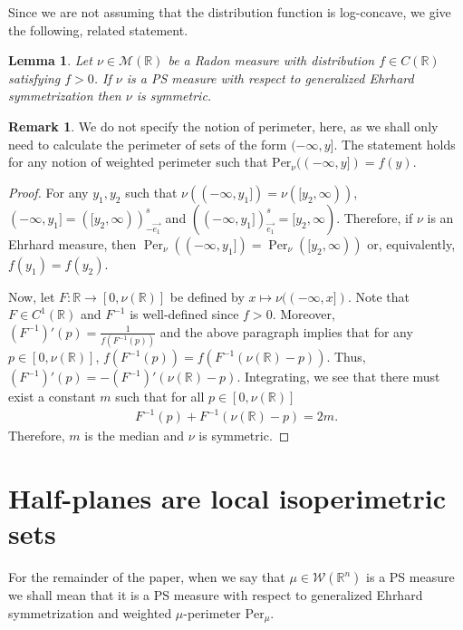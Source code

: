 \documentclass[12pt]{amsart}
\numberwithin{equation}{section}
\theoremstyle{plain}
\newtheorem{lemma}[theorem]{Lemma}
\theoremstyle{definition}
\newtheorem{remark}[theorem]{Remark}
\begin{document}
Since we are not assuming that the distribution function is log-concave, we give the following, related statement.


\begin{lemma}\label{l:Ehrhard implies symmetric}
    Let $\nu \in \mathcal{M}(\mathbb{R})$ be a Radon measure with distribution $f \in C(\mathbb{R})$ satisfying $f>0$.  If $\nu$ is a PS measure with respect to generalized Ehrhard symmetrization then $\nu$ is symmetric. 
\end{lemma}

\begin{remark}
    We do not specify the notion of perimeter, here, as we shall only need to calculate the perimeter of sets of the form $(-\infty, y]$. The statement holds for any notion of weighted perimeter such that $\text{Per}_{\nu}((-\infty, y]) = f(y)$. 
    \end{remark}

\begin{proof}
    For any $y_1,y_2$ such that $\nu((-\infty, y_1]) = \nu([y_2, \infty))$, $(-\infty, y_1] = ([y_2, \infty))^s_{-\vec{e_1}}$ and $((-\infty, y_1])^s_{\vec{e_1}} = [y_2, \infty)$.  Therefore, if $\nu$ is an Ehrhard measure, then $\operatorname{Per}_{\nu}((-\infty, y_1]) = \operatorname{Per}_{\nu}([y_2,\infty))$ or, equivalently, $f(y_1)=f(y_2)$.

    Now, let $F: \mathbb{R} \rightarrow [0, \nu(\mathbb{R})]$ be defined by $x \mapsto \nu((-\infty, x])$.  Note that $F \in C^1(\mathbb{R})$ and $F^{-1}$ is well-defined since $f>0$.  Moreover, $(F^{-1})'(p) = \frac{1}{f(F^{-1}(p))}$ and the above paragraph implies that for any $p \in [0, \nu(\mathbb{R})]$, $f(F^{-1}(p)) = f(F^{-1}(\nu(\mathbb{R}) -p))$. Thus, $(F^{-1})'(p) = -(F^{-1})'(\nu(\mathbb{R})-p)$.  Integrating, we see that there must exist a constant $m$ such that for all $p \in [0, \nu(\mathbb{R})]$ 
    \begin{align*}
        F^{-1}(p) + F^{-1}(\nu(\mathbb{R})-p) = 2m.
    \end{align*}
    Therefore, $m$ is the median and $\nu$ is symmetric.
\end{proof}

\section{Half-planes are local isoperimetric sets}


For the remainder of the paper, when we say that $\mu \in \mathscr{W}(\mathbb{R}^n)$ is a PS measure we shall mean that it is a PS measure with respect to generalized Ehrhard symmetrization and weighted $\mu$-perimeter $\text{Per}_{\mu}$. 
\end{document}
